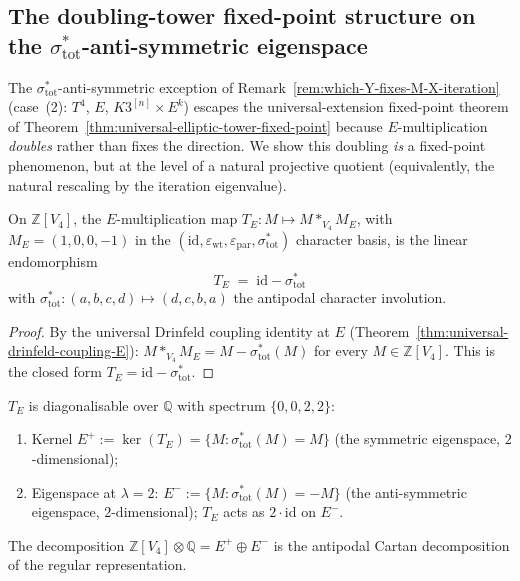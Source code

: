 \subsection{The doubling-tower fixed-point structure on the
 \texorpdfstring{$\sigma_{\mathrm{tot}}^*$}{sigma-tot-*}-anti-symmetric eigenspace}
\label{subsec:doubling-tower-anti-symmetric}

The $\sigma_{\mathrm{tot}}^*$-anti-symmetric exception of
Remark~\ref{rem:which-Y-fixes-M-X-iteration} (case~(2): $T^4$, $E$,
$K3^{[n]} \times E^k$) escapes the universal-extension fixed-point
theorem of Theorem~\ref{thm:universal-elliptic-tower-fixed-point}
because $E$-multiplication \emph{doubles} rather than fixes the
direction. We show this doubling \emph{is} a fixed-point
phenomenon, but at the level of a natural projective quotient
\textup{(}equivalently, the natural rescaling by the iteration
eigenvalue\textup{).}

\begin{theorem}[Closed-form \texorpdfstring{$T_E = \mathrm{id} - \sigma_{\mathrm{tot}}^*$}{T-E = id - sigma-tot-*}]
\label{thm:T-E-closed-form}
On $\mathbb{Z}[V_4]$, the $E$-multiplication map
$T_E \colon M \mapsto M *_{V_4} M_E$, with $M_E = (1, 0, 0, -1)$ in the
$(\mathrm{id}, \varepsilon_{\mathrm{wt}}, \varepsilon_{\mathrm{par}},
\sigma_{\mathrm{tot}}^*)$ character basis, is the linear endomorphism
\[
 T_E \;=\; \mathrm{id} - \sigma_{\mathrm{tot}}^*
\]
with $\sigma_{\mathrm{tot}}^* \colon (a, b, c, d) \mapsto (d, c, b, a)$
the antipodal character involution.
\end{theorem}

\begin{proof}
By the universal Drinfeld coupling identity at $E$
\textup{(}Theorem~\ref{thm:universal-drinfeld-coupling-E}\textup{):}
$M *_{V_4} M_E = M - \sigma_{\mathrm{tot}}^*(M)$ for every
$M \in \mathbb{Z}[V_4]$. This is the closed form
$T_E = \mathrm{id} - \sigma_{\mathrm{tot}}^*$.
\end{proof}

\begin{lemma}
\label{lem:T-E-spectral-decomposition}
$T_E$ is diagonalisable over $\mathbb{Q}$ with spectrum $\{0, 0, 2, 2\}$:
\begin{enumerate}[label=\textup{(\roman*)}]
 \item Kernel
 $E^+ := \ker(T_E) = \{M : \sigma_{\mathrm{tot}}^*(M) = M\}$
 \textup{(}the symmetric eigenspace, $2$-dimensional\textup{);}
 \item Eigenspace at $\lambda = 2$:
 $E^- := \{M : \sigma_{\mathrm{tot}}^*(M) = -M\}$
 \textup{(}the anti-symmetric eigenspace, $2$-dimensional\textup{);}
 $T_E$ acts as $2 \cdot \mathrm{id}$ on $E^-$.
\end{enumerate}
The decomposition $\mathbb{Z}[V_4] \otimes \mathbb{Q} = E^+ \oplus E^-$
is the antipodal Cartan decomposition of the regular representation.
\end{lemma}

